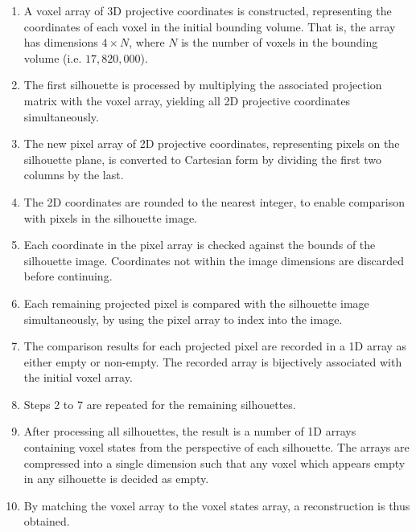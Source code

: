 \begin{enumerate}
  \item A voxel array of 3D projective coordinates is constructed, representing the coordinates of each voxel in the initial bounding volume. That is, the array has dimensions $4\times N$, where $N$ is the number of voxels in the bounding volume (i.e. $17,820,000$).

  \item The first silhouette is processed by multiplying the associated projection matrix with the voxel array, yielding all 2D projective coordinates simultaneously.

  \item The new pixel array of 2D projective coordinates, representing pixels on the silhouette plane, is converted to Cartesian form by dividing the first two columns by the last.

  \item The 2D coordinates are rounded to the nearest integer, to enable comparison with pixels in the silhouette image.

  \item Each coordinate in the pixel array is checked against the bounds of the silhouette image. Coordinates not within the image dimensions are discarded before continuing.

  \item Each remaining projected pixel is compared with the silhouette image simultaneously, by using the pixel array to index into the image.

  \item The comparison results for each projected pixel are recorded in a 1D array as either empty or non-empty. The recorded array is bijectively associated with the initial voxel array.

  \item Steps 2 to 7 are repeated for the remaining silhouettes.

  \item After processing all silhouettes, the result is a number of 1D arrays containing voxel states from the perspective of each silhouette. The arrays are compressed into a single dimension such that any voxel which appears empty in any silhouette is decided as empty.

  \item By matching the voxel array to the voxel states array, a reconstruction is thus obtained.

\end{enumerate}

